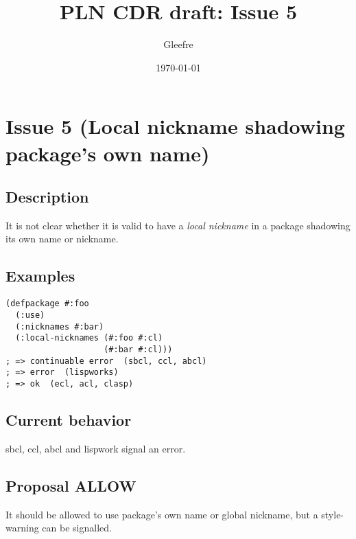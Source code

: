 \documentclass[11pt]{article}
\author{Gleefre}
\date{\today}
\title{PLN CDR draft: Issue 5}
\begin{document}
\maketitle

\section{Issue 5 (Local nickname shadowing package's own name)}
\label{sec:org04e4145}
\subsection{Description}
\label{sec:org2957db6}
It is not clear whether it is valid to have a \emph{local nickname} in a package
shadowing its own name or nickname.
\subsection{Examples}
\label{sec:org25e6697}
\begin{verbatim}
(defpackage #:foo
  (:use)
  (:nicknames #:bar)
  (:local-nicknames (#:foo #:cl)
                    (#:bar #:cl)))
; => continuable error  (sbcl, ccl, abcl)
; => error  (lispworks)
; => ok  (ecl, acl, clasp)
\end{verbatim}
\subsection{Current behavior}
\label{sec:org2c2ccd1}
sbcl, ccl, abcl and lispwork signal an error.
\subsection{Proposal ALLOW}
\label{sec:orgd0b7038}
It should be allowed to use package's own name or global nickname, but a
style-warning can be signalled.
\end{document}
